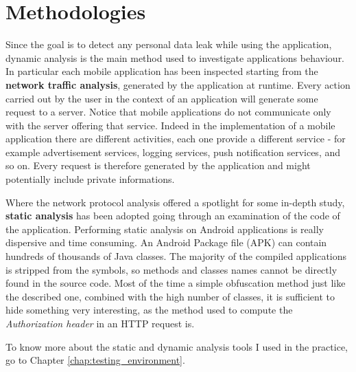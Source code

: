 	\section{Methodologies}
		\par Since the goal is to detect any personal data leak while using the application, dynamic analysis is the main method used to investigate applications behaviour. In particular each mobile application has been inspected starting from the \textbf{network traffic analysis}, generated by the application at runtime. \newline
		Every action carried out by the user in the context of an application will generate some request to a server. Notice that mobile applications do not communicate only with the server offering that service. Indeed in the implementation of a mobile application there are different activities, each one provide a different service - for example advertisement services, logging services, push notification services, and so on. Every request is therefore generated by the application and might potentially include private informations.		
		\par Where the network protocol analysis offered a spotlight for some in-depth study, \textbf{static analysis} has been adopted going through an examination of the code of the application. Performing static analysis on Android applications is really dispersive and time consuming. An Android Package file (APK) can contain hundreds of thousands of Java classes. The majority of the compiled applications is stripped from the symbols, so methods and classes names cannot be directly found in the source code. Most of the time a simple obfuscation method just like the described one, combined with the high number of classes, it is sufficient to hide something very interesting, as the method used to compute the \textit{Authorization header} in an HTTP request is.
		\par To know more about the static and dynamic analysis tools I used in the practice, go to Chapter \ref{chap:testing_environment}.
								
